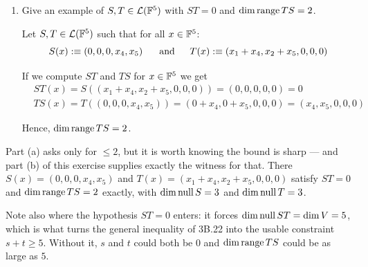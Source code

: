 \begin{xrcs}
\begin{enumerate}[label=\textbf{(\alph*)}]
{\begin{xprf}
      Every other admissible pair gives a smaller value: pushing $s$ down forces $t$ up, and the minimum then tracks $5-t$ downwards. Hence $\dim \myrange TS \leq 2$ in all cases.
    \end{xprf}
    }
    \item{
      Give an example of $S, T \in \mathcal{L}(\mathbb{F}^5)$ with $ST = 0$ and $\dim \operatorname{range} TS = 2$.

      Let $S, T \in \mathcal{L}(\mathbb{F}^5)$ such that for all $x \in \mathbb{F}^5$:
      \begin{equation}
        S(x) :\equiv (0,0,0,x_4,x_5) \quad \;\;\, \text{and}\;\; \quad T(x) :\equiv (x_1 + x_4, x_2 + x_5, 0,0,0)
      \end{equation}

      If we compute $ST$ and $TS$ for $x \in \mathbb{F}^5$ we get
      \begin{equation}
        \begin{aligned}
          &ST(x) = S((x_1 + x_4, x_2 + x_5, 0,0,0)) = (0,0,0,0,0) = 0 \\
          &TS(x) = T((0,0,0,x_4,x_5)) = (0+x_4, 0+x_5, 0,0,0) = (x_4, x_5, 0,0,0)
        \end{aligned}
      \end{equation}

      Hence, $\dim \operatorname{range} TS = 2$.
    }
  \end{enumerate}

\end{xrcs}

\begin{ainote}
  Part (a) asks only for $\leq 2$, but it is worth knowing the bound is sharp --- and part (b) of this exercise supplies exactly the witness for that. There $S(x) = (0,0,0,x_4,x_5)$ and $T(x) = (x_1+x_4, x_2+x_5,0,0,0)$ satisfy $ST = 0$ and $\dim \operatorname{range} TS = 2$ exactly, with $\dim \operatorname{null} S = 3$ and $\dim \operatorname{null} T = 3$.

  Note also where the hypothesis $ST = 0$ enters: it forces $\dim \operatorname{null} ST = \dim V = 5$, which is what turns the general inequality of 3B.22 into the usable constraint $s + t \geq 5$. Without it, $s$ and $t$ could both be $0$ and $\dim \operatorname{range} TS$ could be as large as $5$.
\end{ainote}

